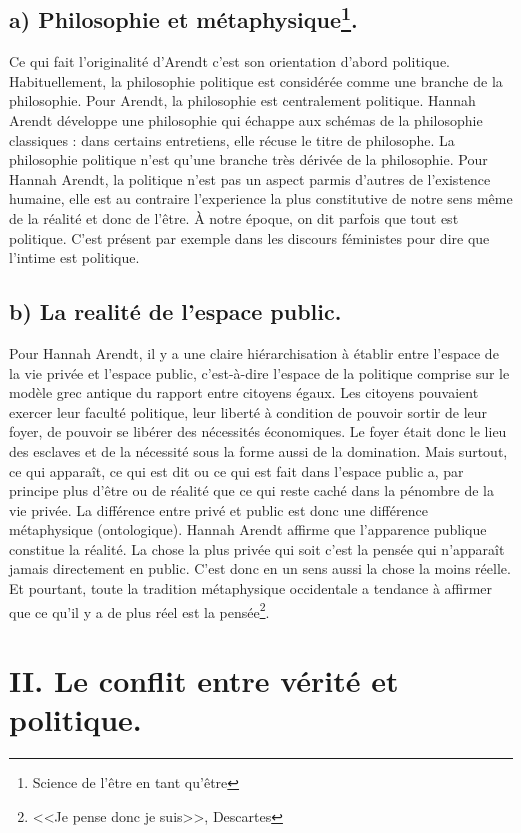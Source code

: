 \documentclass[12pt]{article}
\begin{document}
\subsection*{a) Philosophie et métaphysique\footnote{Science de l'être en tant qu'être}.}
Ce qui fait l'originalité d'Arendt c'est son orientation d'abord politique.
Habituellement, la philosophie politique est considérée comme une branche de la philosophie.
Pour Arendt, la philosophie est centralement politique.
Hannah Arendt développe une philosophie qui échappe aux schémas de la philosophie classiques : dans certains entretiens, elle récuse le titre de philosophe.
La philosophie politique n'est qu'une branche très dérivée de la philosophie.
Pour Hannah Arendt, la politique n'est pas un aspect parmis d'autres de l'existence humaine, elle est au contraire l'experience la plus constitutive de notre sens même de la réalité et donc de l'être.
À notre époque, on dit parfois que tout est politique.
C'est présent par exemple dans les discours féministes pour dire que l'intime est politique.
\subsection*{b) La realité de l'espace public.}
Pour Hannah Arendt, il y a une claire hiérarchisation à établir entre l'espace de la vie privée et l'espace public, c'est-à-dire l'espace de la politique comprise sur le modèle grec antique du rapport entre citoyens égaux.
Les citoyens pouvaient exercer leur faculté politique, leur liberté à condition de pouvoir sortir de leur foyer, de pouvoir se libérer des nécessités économiques. 
Le foyer était donc le lieu des esclaves et de la nécessité sous la forme aussi de la domination.
Mais surtout, ce qui apparaît, ce qui est dit ou ce qui est fait dans l'espace public a, par principe plus d'être ou de réalité que ce qui reste caché dans la pénombre de la vie privée.
La différence entre privé et public est donc une différence métaphysique (ontologique).
Hannah Arendt affirme que l'apparence publique constitue la réalité.
La chose la plus privée qui soit c'est la pensée qui n'apparaît jamais directement en public.
C'est donc en un sens aussi la chose la moins réelle.
Et pourtant, toute la tradition métaphysique occidentale a tendance à affirmer que ce qu'il y a de plus réel est la pensée\footnote{<<Je pense donc je suis>>, Descartes}.
\section*{\color{red}II. Le conflit entre vérité et politique.}
\end{document}
